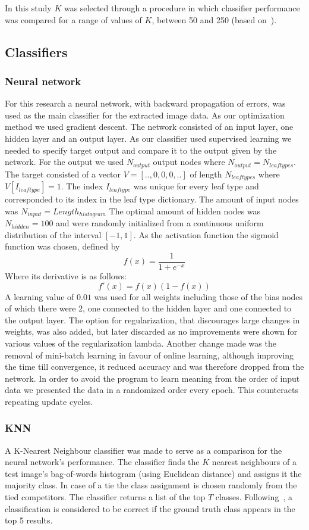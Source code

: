 In this study $K$ was selected through a procedure in which classifier performance was compared for a range of values of $K$, between 50 and 250 (based on~\cite{Nguy2013}).



\subsection{Classifiers}

\subsubsection{Neural network}
For this research a neural network, with backward propagation of errors, was used as the main classifier for the extracted image data. As our optimization method we used gradient descent. The network consisted of an input layer, one hidden layer and an output layer.
As our classifier used supervised learning we needed to specify target output and compare it to the output given by the network. For the output we used $N_{output}$ output nodes where $N_{output}=N_{leaftypes}$. The target consisted of a vector $V=[..,0,0,0,..]$ of length $N_{leaftypes}$ where $V[I_{leaftype}]=1$. The index $I_{leaftype}$ was unique for every leaf type and corresponded to its index in the leaf type dictionary. The amount of input nodes was $N_{input}=Length_{histogram}$ The optimal amount of hidden nodes was $N_{hidden}=100$ and were randomly initialized from a continuous uniform distribution of the interval $[-1, 1]$.
As the activation function the sigmoid function was chosen, defined by $$f(x)=\frac{1}{1+e^{-x}}$$
Where its derivative is as follows:
$$f'(x)=f(x)(1-f(x))$$
A learning value of $0.01$ was used for all weights including those of the bias nodes of which there were 2, one connected to the hidden layer and one connected to the output layer. The option for regularization, that discourages large changes in weights, was also added, but later discarded as no improvements were shown for various values of the regularization lambda. Another change made was the removal of mini-batch learning in favour of online learning, although improving the time till convergence, it reduced accuracy and was therefore dropped from the network.
In order to avoid the program to learn meaning from the order of input data we presented the data in a randomized order every epoch. This counteracts repeating update cycles.

\subsubsection{KNN}
A K-Nearest Neighbour classifier was made to serve as a comparison for the neural network's performance.
The classifier finds the $K$ nearest neighbours of a test image's bag-of-words histogram (using Euclidean distance) and assigns it the majority class.
In case of a tie the class assignment is chosen randomly from the tied competitors.
The classifier returns a list of the top $T$ classes.
Following~\cite{Wang2011, Belh2008}, a classification is considered to be correct if the ground truth class appears in the top 5 results. 
